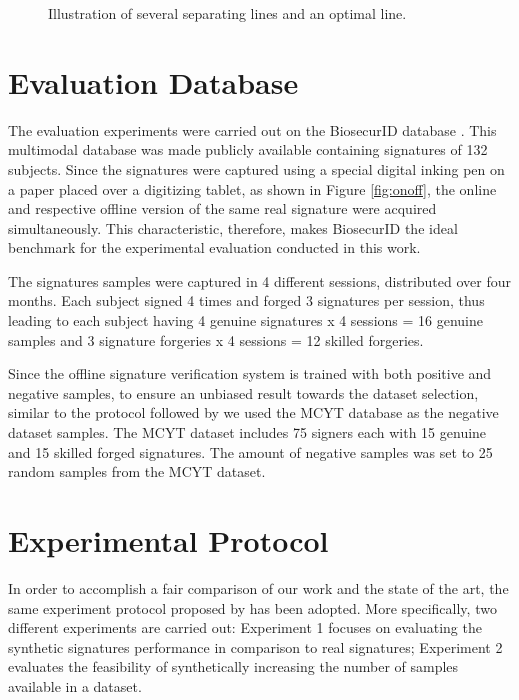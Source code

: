 \begin{figure*}[!htb]
\centering
\hspace*{0.5in} %

\caption{Illustration of several separating lines and an optimal line.} \label{fig:svm}
\end{figure*}


\section{Evaluation Database}

The evaluation experiments were carried out on the BiosecurID database \cite{biosecurid}. This multimodal database was made publicly available containing signatures of 132 subjects. Since the signatures were captured using a special digital inking pen on a paper placed over a digitizing tablet, as shown in Figure \ref{fig:onoff}, the online and respective offline version of the same real signature were acquired simultaneously. This characteristic, therefore, makes BiosecurID the ideal benchmark for the experimental evaluation conducted in this work.


The signatures samples were captured in 4 different sessions, distributed over four months. Each subject signed 4 times and forged 3 signatures per session, thus leading to each subject having 4 genuine signatures x 4 sessions = 16 genuine samples and 3 signature forgeries x 4 sessions = 12 skilled forgeries.

Since the offline signature verification system is trained with both positive and negative samples, to ensure an unbiased result towards the dataset selection, similar to the protocol followed by \cite{diaz2014generation} we used the MCYT database \cite{mcyt-100} as the negative dataset samples. The MCYT dataset includes 75 signers each with 15 genuine and 15 skilled forged signatures. The amount of negative samples was set to 25 random samples from the MCYT dataset.



\section{Experimental Protocol}
In order to accomplish a fair comparison of our work and the state of the art, the same experiment protocol proposed by \cite{diaz2014generation} has been adopted. More specifically, two different experiments are carried out: Experiment 1 focuses on evaluating the synthetic signatures performance in comparison to real signatures; Experiment 2 evaluates the feasibility of synthetically increasing the number of samples available in a dataset.

